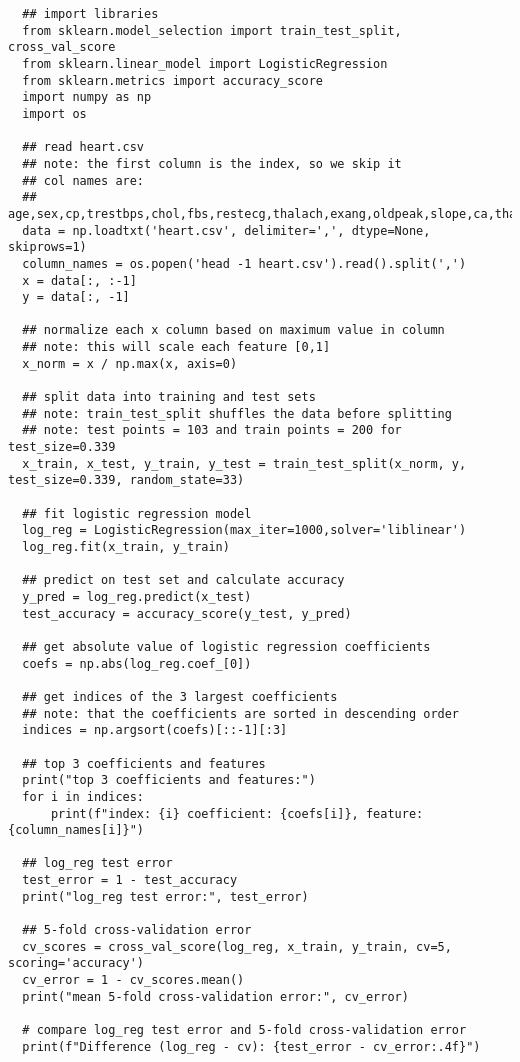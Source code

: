\documentclass{article}
\begin{document}
\begin{lstlisting}
  ## import libraries
  from sklearn.model_selection import train_test_split, cross_val_score
  from sklearn.linear_model import LogisticRegression
  from sklearn.metrics import accuracy_score
  import numpy as np
  import os
  
  ## read heart.csv
  ## note: the first column is the index, so we skip it
  ## col names are:
  ## age,sex,cp,trestbps,chol,fbs,restecg,thalach,exang,oldpeak,slope,ca,thal,target
  data = np.loadtxt('heart.csv', delimiter=',', dtype=None, skiprows=1)
  column_names = os.popen('head -1 heart.csv').read().split(',')
  x = data[:, :-1]
  y = data[:, -1]
  
  ## normalize each x column based on maximum value in column
  ## note: this will scale each feature [0,1]
  x_norm = x / np.max(x, axis=0)
  
  ## split data into training and test sets
  ## note: train_test_split shuffles the data before splitting
  ## note: test points = 103 and train points = 200 for test_size=0.339
  x_train, x_test, y_train, y_test = train_test_split(x_norm, y, test_size=0.339, random_state=33)
  
  ## fit logistic regression model
  log_reg = LogisticRegression(max_iter=1000,solver='liblinear')
  log_reg.fit(x_train, y_train)
  
  ## predict on test set and calculate accuracy
  y_pred = log_reg.predict(x_test)
  test_accuracy = accuracy_score(y_test, y_pred)
  
  ## get absolute value of logistic regression coefficients
  coefs = np.abs(log_reg.coef_[0])
  
  ## get indices of the 3 largest coefficients
  ## note: that the coefficients are sorted in descending order
  indices = np.argsort(coefs)[::-1][:3]
  
  ## top 3 coefficients and features
  print("top 3 coefficients and features:")
  for i in indices:
      print(f"index: {i} coefficient: {coefs[i]}, feature: {column_names[i]}")
  
  ## log_reg test error 
  test_error = 1 - test_accuracy
  print("log_reg test error:", test_error)
  
  ## 5-fold cross-validation error 
  cv_scores = cross_val_score(log_reg, x_train, y_train, cv=5, scoring='accuracy')
  cv_error = 1 - cv_scores.mean()
  print("mean 5-fold cross-validation error:", cv_error)
  
  # compare log_reg test error and 5-fold cross-validation error 
  print(f"Difference (log_reg - cv): {test_error - cv_error:.4f}")
\end{lstlisting}
\end{document}
